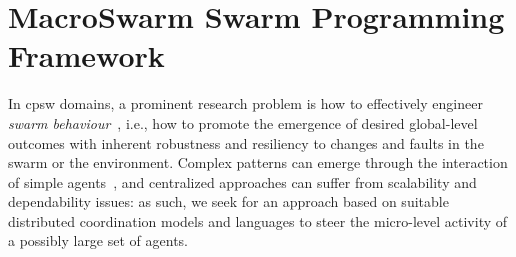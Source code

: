 %
%

\newcommand{\MacroSwarm}{{\sc{}MacroSwarm}}


\chapter[\MacroSwarm{}]{\MacroSwarm{} Swarm Programming Framework}
\minitoc%
%
%
%
In \ac{cpsw} domains,
 a prominent research problem
 is how to effectively engineer \emph{swarm behaviour}~\cite{DBLP:journals/swarm/BrambillaFBD13},
 i.e., how to promote 
 the emergence of desired global-level outcomes %
 with inherent robustness and resiliency to changes and faults in the swarm or the environment.
%
Complex patterns can emerge through the interaction of simple agents~\cite{bonabeau1999swarmintelligence-book}, and centralized approaches %
 can suffer from scalability and dependability issues: as such,  
 we seek for an approach based on %
 suitable distributed coordination models and languages to steer the micro-level activity of a possibly large set of agents.
%
 
